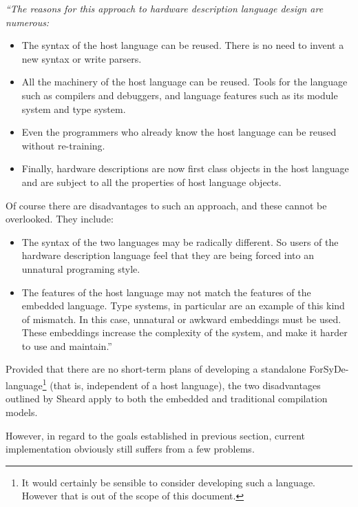 \documentclass[a4paper,twoside,11pt]{article}
\begin{document}
  {\it
    ``The reasons for this approach to hardware description language design
    are numerous:
  \begin{itemize}
  \item The syntax of the host language can be reused. There is no need to
    invent a new syntax or write parsers. 

  \item All the machinery of the host language can be reused. Tools for the
    language such as compilers and debuggers, and language features such as
    its module system and type system.
    
  \item Even the programmers who already know the host language can be reused
    without re-training.

  \item  Finally, hardware descriptions are now first class
    objects in the host language and are subject to all the properties of host
    language objects. 
  \end{itemize}
  
  Of course there are disadvantages to such an approach,
  and these cannot be overlooked. They include: 
  \begin{itemize}
  \item The syntax of the two languages may be radically different. So users
    of the hardware description language feel that they are being forced into
    an unnatural programing style.

  \item The features of the host language may not match the features of the
    embedded language. Type systems, in particular are an example of this kind
    of mismatch. In this case, unnatural or awkward embeddings must be
    used. These embeddings increase the complexity of the system, and make it
    harder to use and maintain.''
  \end{itemize}
}


Provided that there are no short-term plans of developing a standalone
ForSyDe-language\footnote{It would certainly be sensible to consider
  developing such a language. However that is out of the scope of this
  document.}  (that is, independent of a host language), the two disadvantages
outlined by Sheard apply to both the embedded and traditional compilation models.

However, in regard to the goals established in previous section, current
implementation obviously still suffers from a few problems.
\end{document}
